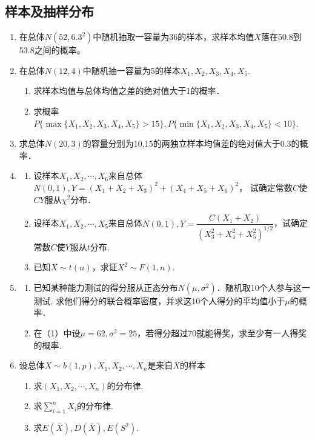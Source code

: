 \subsection{样本及抽样分布}

\begin{enumerate}



    \item 在总体$N(52,6.3^2)$中随机抽取一容量为36的样本，求样本均值$\overline{X}$落在50.8到53.8之间的概率。
        


    \item  在总体$N(12,4)$中随机抽一容量为5的样本$X_1,X_2,X_3,X_4,X_5$.
    \begin{enumerate}
        \item 求样本均值与总体均值之差的绝对值大于1的概率．
        \item 求概率$P\{\max\{X_1,X_2,X_3,X_4,X_5\}>15\},P\{\min \{X_1,X_2,X_3,X_4,X_5\}<10\}$.
    \end{enumerate}


    \item 求总体$N(20,3)$的容量分别为10,15的两独立样本均值差的绝对值大于0.3的概率．
    

    \item \begin{enumerate}
        \item 设样本$X_1,X_2,\cdots,X_6$来自总体$N(0,1),Y=(X_1+X_2+X_3)^2+(X_4+X_5+X_6)^2$，
        试确定常数$C$使$CY$服从$\chi ^2$分布．
        \item 设样本$X_1,X_2,\cdots,X_5$来自总体$N(0,1),Y=\dfrac{C(X_1+X_2)}{(X_3^2+X_4^2+X_5^2)^{1/2}}$，试确定
        常数$C$使$Y$服从$t$分布.
        \item 已知$X\sim t(n)$，求证$X^2\sim F(1,n)$.
    \end{enumerate}



    \item \begin{enumerate}
        \item 已知某种能力测试的得分服从正态分布$N(\mu,\sigma^2)$．随机取10个人参与这一测试.
        求他们得分的联合概率密度，并求这10个人得分的平均值小于$\mu$的概率．
        \item 在（1）中设$\mu=62,\sigma^2=25$，若得分超过70就能得奖，求至少有一人得奖的概率.
    \end{enumerate}


    \item 设总体$X\sim b(1,p),X_1,X_2,\cdots,X_n$是来自$X$的样本
    \begin{enumerate}
        \item 求$(X_1,X_2,\cdots,X_n)$的分布律.
        \item 求$\displaystyle{\sum_{i=1}^n X_i}$的分布律.
        \item 求$E(\overline{X}),D(\overline{X}),E(S^2)$.
    \end{enumerate}



\end{enumerate}
